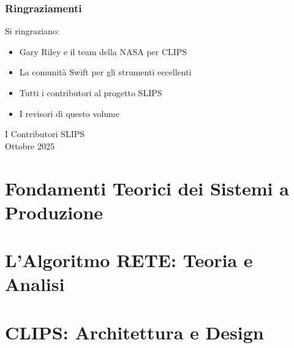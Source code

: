 \documentclass[12pt,a4paper,twoside,openright]{book}
\theoremstyle{definition}
\theoremstyle{remark}
\begin{document}
\section*{Ringraziamenti}

Si ringraziano:
\begin{itemize}
\item Gary Riley e il team della NASA per CLIPS
\item La comunità Swift per gli strumenti eccellenti
\item Tutti i contributori al progetto SLIPS
\item I revisori di questo volume
\end{itemize}

\vspace{1cm}
\begin{flushright}
I Contributori SLIPS\\
Ottobre 2025
\end{flushright}

\tableofcontents
\listoffigures
\listoftables
\lstlistoflistings

\mainmatter

\part{Fondamenti Teorici dei Sistemi a Produzione}






\part{L'Algoritmo RETE: Teoria e Analisi}








\part{CLIPS: Architettura e Design}






\end{document}
